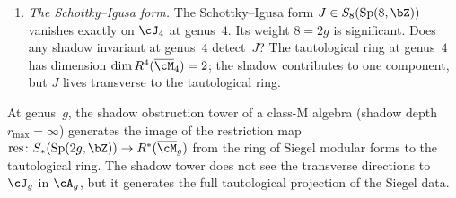 \begin{openproblem}
\begin{enumerate}[label=\textup{(\roman*)}]
 $Z_g(\Omega)$ for $K3 \times E$ \emph{is} constrained
 by Schottky at $g \geq 4$: it is defined on $\cJ_g$,
 not all of $\cA_g$. The gap between shadow
 (tautological) and partition function (analytic)
 at $g \geq 4$ measures the failure of the shadow tower
 to capture the full moduli dependence.
\item \emph{The Schottky--Igusa form.} The Schottky--Igusa
 form $J \in S_8(\operatorname{Sp}(8,\bZ))$ vanishes
 exactly on $\cJ_4$ at genus~$4$. Its weight $8 = 2g$
 is significant. Does any shadow invariant at genus~$4$
 detect~$J$? The tautological ring at genus~$4$ has
 dimension $\dim R^4(\overline{\cM}_4) = 2$; the shadow
 contributes to one component, but $J$ lives transverse
 to the tautological ring.
\end{enumerate}
\end{openproblem}

\begin{conjecture}
\label{conj:shadow-taut-projection}
\ClaimStatusConjectured
{}
At genus~$g$, the shadow obstruction tower of a class-M
algebra \textup{(}shadow depth $r_{\max} = \infty$\textup{)}
generates the image of the restriction map
$\operatorname{res} \colon S_*(\operatorname{Sp}(2g,\bZ))
\to R^*(\overline{\cM}_g)$
from the ring of Siegel modular forms to the tautological
ring. The shadow tower does not see the transverse
directions to $\cJ_g$ in $\cA_g$, but it generates the
full tautological projection of the Siegel data.
\end{conjecture}

